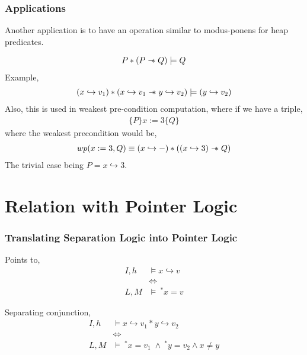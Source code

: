 \documentclass{beamer}
\newcommand\sepimp{\mathrel{-\mkern-6mu*}}
\begin{document}
\begin{frame}
\frametitle{Applications}
Another application is to have an operation similar to modus-ponens for heap predicates.

\begin{align*}
    P * (P \sepimp Q) \models Q
\end{align*}
Example,
\begin{align*}
    (x \hookrightarrow v_1) * (x \hookrightarrow v_1 \sepimp y \hookrightarrow v_2) \models (y \hookrightarrow v_2)
\end{align*}
Also, this is used in weakest pre-condition computation, where if we have a triple,
    \begin{align*}
    \{P\}x := 3\{Q\}
    \end{align*}
where the weakest precondition would be,
    \begin{align*}
        wp(x := 3, Q) \equiv (x \hookrightarrow -) * ((x \hookrightarrow 3) \sepimp Q)
    \end{align*}
The trivial case being $P = x \hookrightarrow 3$.
\end{frame}
\section{Relation with Pointer Logic}

\begin{frame}
\frametitle{Translating Separation Logic into Pointer Logic}
Points to,
\begin{align*}
    I,h & \models x \hookrightarrow v \\
    & \Longleftrightarrow \\
    L,M & \models \ ^*x = v
\end{align*}

Separating conjunction,
\begin{align*}
    I,h & \models x \hookrightarrow v_1 * y \hookrightarrow v_2 \\
    & \Longleftrightarrow \\
    L,M & \models \ ^*x = v_1 \; \land \ ^*y = v_2 \land x \neq y
\end{align*}
\end{frame}
\end{document}
